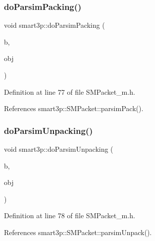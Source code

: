 \subsubsection{\texorpdfstring{do\+Parsim\+Packing()}{doParsimPacking()}}
{\footnotesize\ttfamily void smart3p\+::do\+Parsim\+Packing (\begin{DoxyParamCaption}\item[{omnetpp\+::c\+Comm\+Buffer $\ast$}]{b,  }\item[{const \hyperlink{classsmart3p_1_1SMPacket}{S\+M\+Packet} \&}]{obj }\end{DoxyParamCaption})\hspace{0.3cm}{\ttfamily [inline]}}



Definition at line 77 of file S\+M\+Packet\+\_\+m.\+h.



References smart3p\+::\+S\+M\+Packet\+::parsim\+Pack().

\mbox{\label{namespacesmart3p_aaf72073ed0fb3822a7735f7d00cdc2b3}} 
\subsubsection{\texorpdfstring{do\+Parsim\+Unpacking()}{doParsimUnpacking()}}
{\footnotesize\ttfamily void smart3p\+::do\+Parsim\+Unpacking (\begin{DoxyParamCaption}\item[{omnetpp\+::c\+Comm\+Buffer $\ast$}]{b,  }\item[{\hyperlink{classsmart3p_1_1SMPacket}{S\+M\+Packet} \&}]{obj }\end{DoxyParamCaption})\hspace{0.3cm}{\ttfamily [inline]}}



Definition at line 78 of file S\+M\+Packet\+\_\+m.\+h.



References smart3p\+::\+S\+M\+Packet\+::parsim\+Unpack().

\mbox{\label{namespacesmart3p_a246a33bd787e27680c6cbddf141a48d4}} 
